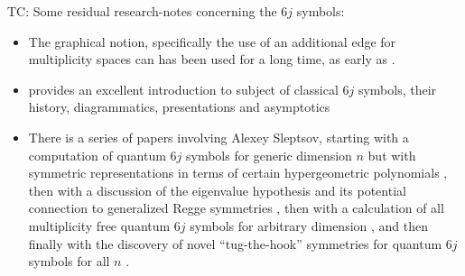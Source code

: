 \documentclass[notitlepage, 10pt]{article}
\begin{document}
{\color{green!60!black}
TC: Some residual research-notes concerning the $6j$ symbols:
\begin{itemize}
    \item The graphical notion, specifically the use of an additional edge for multiplicity spaces can has been used for a long time, as early as \cite{agrawala1968graphical,moussouris1984quantum}.
    \item \citeauthor{aquilanti2012semiclassical} provides an excellent introduction to subject of classical $6j$ symbols, their history, diagrammatics, presentations and asymptotics \cite{aquilanti2012semiclassical}
    \item There is a series of papers involving Alexey Sleptsov, starting with a computation of quantum $6j$ symbols for generic dimension $n$ but with symmetric representations in terms of certain hypergeometric polynomials \cite{mironov2017sixj}, then with a discussion of the eigenvalue hypothesis and its potential connection to generalized Regge symmetries \cite{morozov2018new}, then with a calculation of all multiplicity free quantum $6j$ symbols for arbitrary dimension \cite{alekseev2020multiplicity}, and then finally with the discovery of novel ``tug-the-hook'' symmetries for quantum $6j$ symbols for all $n$ \cite{lanina2023tug}.
\end{itemize}
}
\end{document}
